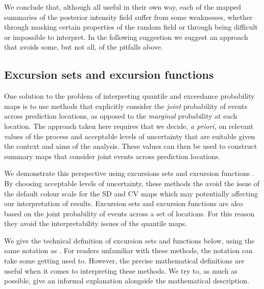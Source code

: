\documentclass{stylefile16/statsoc}
\begin{document}
We conclude that, although all useful in their own way, each of the mapped summaries of the posterior intensity field suffer from some weaknesses, whether through masking certain properties of the random field or through being difficult or impossible to interpret. In the following suggestion we suggest an approach that avoids some, but not all, of the pitfalls above.

\subsection{Excursion sets and excursion functions}

One solution to the problem of interpreting quantile and exceedance probability maps is to use methods that explicitly consider the \textit{joint} probability of events across prediction locations, as opposed to the \textit{marginal} probability at each location. The approach taken here requires that we decide, \emph{a priori}, on relevant values of the process and acceptable levels of uncertainty that are suitable given the context and aims of the analysis.  These values can then be used to construct summary maps that consider joint events across prediction locations.  

We demonstrate this perspective using excursions sets and excursion functions \citep{bolin_excursion_2015}. By choosing acceptable levels of uncertainty, these methods the avoid the issue of the default colour scale for the SD and CV maps which may potentially affecting our interpretation of results.  Excursion sets and excursion functions are also based on the joint probability of events across a set of locations.  For this reason they avoid the interpretability issues of the quantile maps.

We give the technical definition of excursion sets and functions below, using the same notation as \cite{bolin_excursion_2015}.  For readers unfamiliar with these methods, the notation can take some getting used to.  However, the precise mathematical definitions are useful when it comes to interpreting these methods.  We try to, as much as possible, give an informal explanation alongside the mathematical description.
\end{document}
